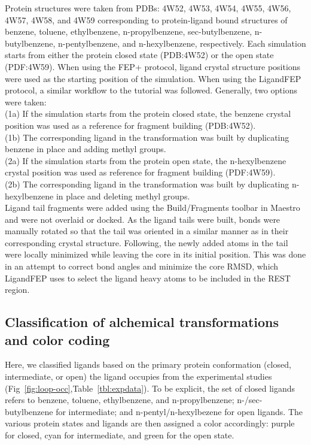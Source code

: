 \documentclass[journal=jctcce,manuscript=article]{achemso}
\begin{document}
Protein structures were taken from PDBs: 4W52, 4W53, 4W54, 4W55, 4W56, 4W57, 4W58, and 4W59 corresponding to protein-ligand bound structures of benzene, toluene, ethylbenzene, n-propylbenzene, sec-butylbenzene, n-butylbenzene, n-pentylbenzene, and n-hexylbenzene, respectively\cite{Merski2015}.
Each simulation starts from either the protein closed state (PDB:4W52) or the open state (PDF:4W59).
When using the FEP+ protocol, ligand crystal structure positions were used as the starting position of the simulation.
When using the LigandFEP protocol, a similar workflow to the tutorial\cite{LigandFEP} was followed.
Generally, two options were taken:\\
(1a) If the simulation starts from the protein closed state, the benzene crystal position was used as a reference for fragment building (PDB:4W52).\\
(1b) The corresponding ligand in the transformation was built by duplicating benzene in place and adding methyl groups.\\
(2a) If the simulation starts from the protein open state, the n-hexylbenzene crystal position was used as reference for fragment building (PDF:4W59).\\
(2b) The corresponding ligand in the transformation was built by duplicating n-hexylbenzene in place and deleting methyl groups.\\

Ligand tail fragments were added using the Build/Fragments toolbar in Maestro  and were not overlaid or docked. 
As the ligand tails were built, bonds were manually rotated so that the tail was oriented in a similar manner as in their corresponding crystal structure.
Following, the newly added atoms in the tail were locally minimized while leaving the core in its initial position.
This was done in an attempt to correct bond angles and minimize the core RMSD, which LigandFEP uses to select the ligand heavy atoms to be included in the REST region. 

\subsection*{Classification of alchemical transformations and color coding}
Here, we classified ligands based on the primary protein conformation (closed, intermediate, or open) the ligand occupies from the experimental studies (Fig~\ref{fig:loop-occ},Table~\ref{tbl:expdata}).
To be explicit, the set of closed ligands refers to benzene, toluene, ethylbenzene, and n-propylbenzene; n-/sec-butylbenzene for intermediate; and n-pentyl/n-hexylbezene for open ligands.
The various protein states and ligands are then assigned a color accordingly: purple for closed, cyan for intermediate, and green for the open state.
\end{document}
